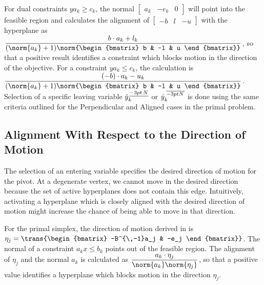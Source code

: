 For dual constraints $y a_k \geq c_k$, the normal
$\begin{bmatrix} a_k & -e_k & 0 \end{bmatrix}$ will point into the
feasible region
and \dylp calculates the alignment of 
$\begin{bmatrix} -b & l & -u \end{bmatrix}$ with the hyperplane as
$\displaystyle \frac{b \cdot a_k + l_k}
  {(\norm{a_k}+1)\norm{\begin{bmatrix} b & -l & u \end{bmatrix}}}$, so that a
positive result identifies a constraint which blocks motion in
the direction of the objective.
For a constraint $y a_k \leq c_k$, the calculation is
$\displaystyle \frac{(-b) \cdot a_k - u_k}
  {(\norm{a_k}+1)\norm{\begin{bmatrix} b & -l & u \end{bmatrix}}}$.
Selection of a specific leaving variable $\check{y}^{\nblb}_k$ or
$\hat{y}^{\nbub}_k$ is done using the same criteria outlined for the
Perpendicular and Aligned cases in the primal problem.

\subsection{Alignment With Respect to the Direction of Motion}

The selection of an entering variable specifies the desired direction of
motion for the pivot.
At a degenerate vertex, we cannot move in the desired direction because the
set of active hyperplanes does not contain this edge.
Intuitively, activating a hyperplane which is closely aligned with the desired
direction of motion might increase the chance of being able to move in that
direction.

For the primal simplex, the direction of motion
derived in 
is $\eta_j = \trans{\begin{bmatrix} -B^{\,-1}a_j & -e_j \end{bmatrix}}$.
The normal of a constraint $a_k x \leq b_k$ points out of the feasible region.
The alignment of $\eta_j$ and the normal $a_k$ is calculated
as $\displaystyle \frac{a_k \cdot \eta_j}{\norm{a_k}\norm{\eta_j}}$, so that
a positive value identifies a hyperplane which blocks motion in the
direction $\eta_j$.

